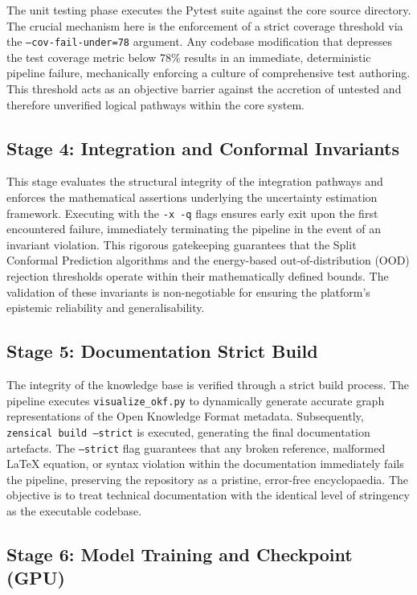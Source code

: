 The unit testing phase executes the Pytest suite against the core source directory. The crucial mechanism here is the enforcement of a strict coverage threshold via the \texttt{--cov-fail-under=78} argument. Any codebase modification that depresses the test coverage metric below 78\% results in an immediate, deterministic pipeline failure, mechanically enforcing a culture of comprehensive test authoring. This threshold acts as an objective barrier against the accretion of untested and therefore unverified logical pathways within the core system.

\subsection{Stage 4: Integration and Conformal Invariants}

This stage evaluates the structural integrity of the integration pathways and enforces the mathematical assertions underlying the uncertainty estimation framework. Executing with the \texttt{-x -q} flags ensures early exit upon the first encountered failure, immediately terminating the pipeline in the event of an invariant violation. This rigorous gatekeeping guarantees that the Split Conformal Prediction algorithms and the energy-based out-of-distribution (OOD) rejection thresholds operate within their mathematically defined bounds. The validation of these invariants is non-negotiable for ensuring the platform's epistemic reliability and generalisability.

\subsection{Stage 5: Documentation Strict Build}

The integrity of the knowledge base is verified through a strict build process. The pipeline executes \texttt{visualize\_okf.py} to dynamically generate accurate graph representations of the Open Knowledge Format metadata. Subsequently, \texttt{zensical build --strict} is executed, generating the final documentation artefacts. The \texttt{--strict} flag guarantees that any broken reference, malformed LaTeX equation, or syntax violation within the documentation immediately fails the pipeline, preserving the repository as a pristine, error-free encyclopaedia. The objective is to treat technical documentation with the identical level of stringency as the executable codebase.

\subsection{Stage 6: Model Training and Checkpoint (GPU)}

